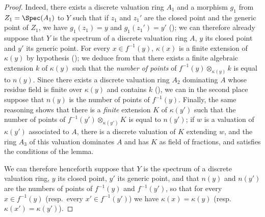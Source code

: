 \begin{proof}
Indeed, there exists a discrete valuation ring $A_1$ and a morphism $g_1$ from $Z_1=\Spec(A_1)$ to $Y$ such that if $z_1$ and $z_1'$ are the closed point and the generic point of $Z_1$,
we have $g_1(z_1)=y$ and $g_1(z_1')=y'$ (); we can therefore already suppose that $Y$ is the spectrum of a discrete valuation ring $A$, $y$ its closed point and $y'$ its generic point.
For every $x\in f^{-1}(y)$, $\kappa(x)$ is a finite extension of $\kappa(y)$ by hypothesis (); we deduce from  that there exists a finite algebraic extension $k$ of $\kappa(y)$ such that the \emph{number of points} of $f^{-1}(y)\otimes_{\kappa(y)}k$ is equal to $n(y)$.
Since there exists a discrete valuation ring $A_2$ dominating $A$ whose residue field is finite over $\kappa(y)$ and contains $k$ (), we can in the second place suppose that $n(y)$ is the number of points of $f^{-1}(y)$.
Finally, the same reasoning shows that there is a \emph{finite} extension $K$ of $\kappa(y')$ such that the number of points of $f^{-1}(y')\otimes_{\kappa(y')}K$ is equal to $n(y')$; if $w$ is a valuation of $\kappa(y')$ associated to $A$, there is a discrete valuation of $K$ extending $w$, and the ring $A_3$ of this valuation dominates $A$ and has $K$ as field of fractions, and satisfies the conditions of the lemma.

We can therefore henceforth suppose that $Y$ is the spectrum of a discrete valuation ring, $y$ its closed point, $y'$ its generic point, and that $n(y)$ and $n(y')$ are the numbers of points of $f^{-1}(y)$ and $f^{-1}(y')$, so that for every $x\in f^{-1}(y)$ (resp.\ every $x'\in f^{-1}(y')$) we have $\kappa(x)=\kappa(y)$ (resp.\ $\kappa(x')=\kappa(y')$).


\end{proof}
